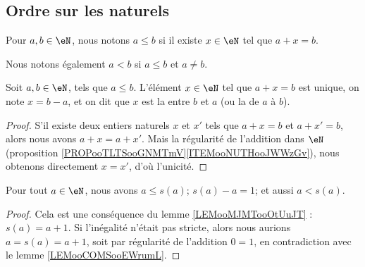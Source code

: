 \subsection{Ordre sur les naturels}
\label{SUBooOrdreNaturels}

\begin{definition}     \label{DEFooAXZSooTEMjlV}
	Pour \( a,b\in \eN\), nous notons \( a\leq b\) si il existe \( x\in \eN\) tel que \( a+x=b\).

	Nous notons également \( a<b \) si \( a\leq b\) et \( a\neq b\).
\end{definition}

\begin{propositionDef}	\label{PROPooDEFSoustractionN}
	Soit \( a,b\in \eN\), tels que \( a\leq b\). L'élément  \( x\in \eN\) tel que \( a+x=b\) est unique, on note \( x = b - a \), et on dit que \( x \) est la  entre \( b \) et \( a \)  (ou la  de \( a \) à \( b \)).
\end{propositionDef}

\begin{proof}
	S'il existe deux entiers naturels \( x \) et \( x' \) tels que \( a + x = b \) et \( a + x' = b\), alors nous avons \( a + x = a + x' \). Mais la régularité de l'addition dans \( \eN \) (proposition \ref{PROPooTLTSooGNMTmV}\ref{ITEMooNUTHooJWWzGv}), nous obtenons directement \( x = x' \), d'où l'unicité.
\end{proof}

\begin{lemma}       \label{LEMooWMYPooLTMyWb}
	Pour tout \( a\in \eN\), nous avons \( a\leq s(a)\); \( s(a) - a = 1 \); et aussi \( a < s(a) \).
\end{lemma}

\begin{proof}
	Cela est une conséquence du lemme \ref{LEMooMJMTooOtUuJT} : \( s(a)=a+1\). Si l'inégalité n'était pas stricte, alors nous aurions \( a = s(a) = a + 1 \), soit par régularité de l'addition \( 0 = 1 \), en contradiction avec le lemme \ref{LEMooCOMSooEWrumL}.
\end{proof}

